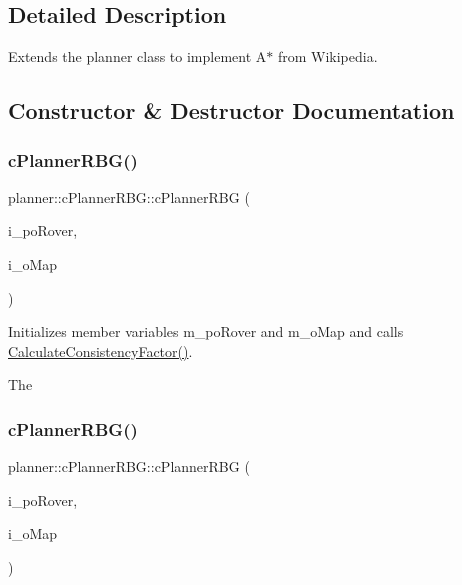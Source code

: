 \subsection{Detailed Description}
Extends the planner class to implement A$\ast$ from Wikipedia. 

\subsection{Constructor \& Destructor Documentation}
\mbox{\label{classplanner_1_1c_planner_r_b_g_a91296b98e64effc16f38e2430746d94d}} 
\subsubsection{\texorpdfstring{c\+Planner\+R\+B\+G()}{cPlannerRBG()}\hspace{0.1cm}{\footnotesize\ttfamily [1/2]}}
{\footnotesize\ttfamily planner\+::c\+Planner\+R\+B\+G\+::c\+Planner\+R\+BG (\begin{DoxyParamCaption}\item[{std\+::shared\+\_\+ptr$<$ \mbox{\hyperlink{classplanner_1_1c_rover_interface}{c\+Rover\+Interface}}$<$ 8 $>$$>$}]{i\+\_\+po\+Rover,  }\item[{std\+::shared\+\_\+ptr$<$ \mbox{\hyperlink{classplanner_1_1c_graph}{c\+Graph}} $>$}]{i\+\_\+o\+Map }\end{DoxyParamCaption})}



Initializes member variables m\+\_\+po\+Rover and m\+\_\+o\+Map and calls \mbox{\hyperlink{classplanner_1_1c_planner_a2e5a745f83f903662eff914d8beddb5e}{Calculate\+Consistency\+Factor()}}. 

The \mbox{\label{classplanner_1_1c_planner_r_b_g_a91296b98e64effc16f38e2430746d94d}} 
\subsubsection{\texorpdfstring{c\+Planner\+R\+B\+G()}{cPlannerRBG()}\hspace{0.1cm}{\footnotesize\ttfamily [2/2]}}
{\footnotesize\ttfamily planner\+::c\+Planner\+R\+B\+G\+::c\+Planner\+R\+BG (\begin{DoxyParamCaption}\item[{std\+::shared\+\_\+ptr$<$ \mbox{\hyperlink{classplanner_1_1c_rover_interface}{c\+Rover\+Interface}}$<$ 8 $>$$>$}]{i\+\_\+po\+Rover,  }\item[{std\+::shared\+\_\+ptr$<$ \mbox{\hyperlink{classplanner_1_1c_graph}{c\+Graph}} $>$}]{i\+\_\+o\+Map }\end{DoxyParamCaption})}



